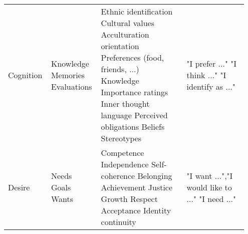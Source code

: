 \begin{table}
\begin{tabular}{>{\raggedright\arraybackslash}p{0.15\linewidth} 
>{\raggedright\arraybackslash}p{0.20\linewidth} 
>{\raggedright\arraybackslash}p{0.35\linewidth} 
>{\raggedright\arraybackslash}p{0.25\linewidth}}
Cognition & 
Knowledge \linebreak  Memories \linebreak Evaluations \linebreak & 
Ethnic identification \linebreak Cultural values \linebreak Acculturation orientation \linebreak Preferences (food, friends, ...) \linebreak Knowledge \linebreak Importance ratings \linebreak Inner thought language \linebreak Perceived obligations \linebreak Beliefs \linebreak Stereotypes \linebreak & 
"I prefer ..." \linebreak "I think ..." \linebreak "I identify as ..." \linebreak \\ 

Desire & 
Needs \linebreak Goals \linebreak Wants \linebreak & 
Competence \linebreak Independence \linebreak Self-coherence \linebreak Belonging \linebreak Achievement \linebreak Justice \linebreak Growth \linebreak Respect \linebreak Acceptance \linebreak Identity continuity \linebreak & 
"I want ...",\linebreak "I would like to ..." \linebreak "I need ..." \linebreak \\ 

\hline
\end{tabular}
\end{table}
